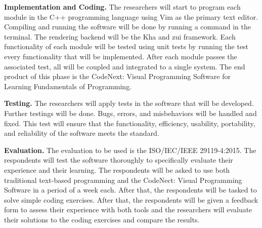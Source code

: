 \flushleft
\textbf{Implementation and Coding.}
\justifying
\parx
The researchers will start to program each module in the C++ programming
language using Vim as the primary text editor. Compiling and running the software
will be done by running a command in the terminal. The rendering backend will be
the Kha and zui framework. Each functionality of each module will be tested
using unit tests by running the test every functionality that will be implemented.
After each module passes the associated test, all will be coupled and
integrated to a single system. The end product of this phase is the CodeNext:
Visual Programming Software for Learning Fundamentals of Programming.

\flushleft
\textbf{Testing.}
\justifying
\parx
The researchers will apply tests in the software that will be developed.
Further testings will be done. Bugs, errors, and misbehaviors will be handled
and fixed. This test will ensure that the functionality, efficiency,
usability, portability, and reliability of the software meets the standard.

\flushleft
\textbf{Evaluation.}
\justifying
\parx
The evaluation to be used is the ISO/IEC/IEEE 29119-4:2015. The respondents
will test the software thoroughly to specifically evaluate their experience and
their learning.
The respondents will be asked to use both traditional text-based programming and the
CodeNect: Visual Programming Software in a period of a week each. After that, the
respondents will be tasked to solve simple coding exercises. After that, the
respondents will be given a feedback form to assess their experience with both
tools and the researchers will evaluate their solutions to the coding exercises
and compare the results.
